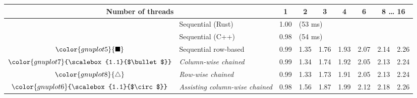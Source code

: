 \begin{tabular}{clrrrrrrr}
\toprule
\multicolumn{2}{c}{\textbf{Number of threads}} & \multicolumn{1}{c}{\textbf{ 1 }} & \multicolumn{1}{c}{\textbf{ 2 }} & \multicolumn{1}{c}{\textbf{ 3 }} & \multicolumn{1}{c}{\textbf{ 4 }} & \multicolumn{1}{c}{\textbf{ 6 }} & \multicolumn{2}{c}{\textbf{ 8 } \dots \textbf{ 16 }} \\
\midrule
& Sequential (Rust) & \multicolumn{1}{r}{ 1.00 } & \multicolumn{ 6 }{l}{(53 ms)} \\
& Sequential (C++) & \multicolumn{1}{r}{ 0.98 } & \multicolumn{ 6 }{l}{(54 ms)} \\
\rowcolor{gnuplot5!10}$\color{gnuplot5}{\blacksquare}$ & Sequential row-based & \cellcolor{gnuplot5!10} 0.99 & \cellcolor{gnuplot5!10} 1.35 & \cellcolor{gnuplot5!10} 1.76 & \cellcolor{gnuplot5!10} 1.93 & \cellcolor{gnuplot5!10} 2.07 & \cellcolor{gnuplot5!10} 2.14 & \cellcolor{gnuplot5!10} 2.26 \\
\rowcolor{gnuplot7!30}$\color{gnuplot7}{\scalebox{1.1}{$\bullet$}}$ & \textit{Column-wise chained} & \cellcolor{gnuplot7!30} 0.99 & \cellcolor{gnuplot7!30} 1.34 & \cellcolor{gnuplot7!30} 1.74 & \cellcolor{gnuplot7!30} 1.92 & \cellcolor{gnuplot7!30} 2.05 & \cellcolor{gnuplot7!30} 2.13 & \cellcolor{gnuplot7!30} 2.24 \\
\rowcolor{gnuplot8!30}$\color{gnuplot8}{\triangle}$ & \textit{Row-wise chained} & \cellcolor{gnuplot8!30} 0.99 & \cellcolor{gnuplot8!30} 1.33 & \cellcolor{gnuplot8!30} 1.73 & \cellcolor{gnuplot8!30} 1.91 & \cellcolor{gnuplot8!30} 2.05 & \cellcolor{gnuplot8!30} 2.13 & \cellcolor{gnuplot8!30} 2.24 \\
\rowcolor{gnuplot6!30}$\color{gnuplot6}{\scalebox{1.1}{$\circ$}}$ & \textit{Assisting column-wise chained} & \cellcolor{gnuplot6!30} 0.98 & \cellcolor{gnuplot6!30} 1.56 & \cellcolor{gnuplot6!30} 1.87 & \cellcolor{gnuplot6!30} 1.99 & \cellcolor{gnuplot6!30} 2.12 & \cellcolor{gnuplot6!30} 2.18 & \cellcolor{gnuplot6!30} 2.26 \\
\bottomrule
\end{tabular}

